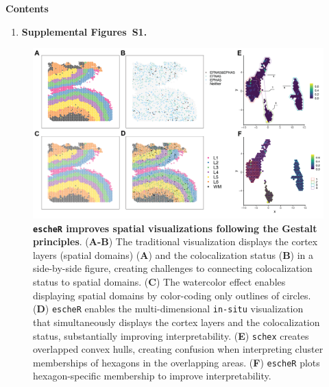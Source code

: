 \documentclass[10pt,twocolumn]{article}
\begin{document}
\renewcommand{\figurename}{Supplementary Figure}
\renewcommand{\tablename}{Supplementary Table}
\setcounter{figure}{0}
\setcounter{table}{0}
\setcounter{section}{0}
\setcounter{page}{1}
\makeatletter
\renewcommand{\thefigure}{S\@arabic\c@figure}
\renewcommand{\thetable}{S\@arabic\c@table}
\renewcommand{\thesection}{Supplemental Note S\@arabic\c@section}
\makeatother

\vspace*{1cm}

{\bf \large Contents}

\begin{enumerate}
    \item \textbf{Supplemental Figures~S1.}
\end{enumerate}

\clearpage 



\begin{figure}[!h]
\begin{center}
\includegraphics[width=\textwidth]{Manuscript/figure/fig_grid.png}
\caption{\small \textbf{\texttt{escheR} improves spatial visualizations following the Gestalt principles}. (\textbf{A-B}) The traditional visualization displays the cortex layers (spatial domains) (\textbf{A}) and the colocalization status (\textbf{B}) in a side-by-side figure, creating challenges to connecting colocalization status to spatial domains. (\textbf{C}) The watercolor effect enables displaying spatial domains by color-coding only outlines of circles. (\textbf{D}) \texttt{escheR} enables the multi-dimensional \texttt{in-situ} visualization that simultaneously displays the cortex layers and the colocalization status, substantially improving interpretability. (\textbf{E}) \texttt{schex} creates overlapped convex hulls, creating confusion when interpreting cluster memberships of hexagons in the overlapping areas. (\textbf{F}) \texttt{escheR} plots hexagon-specific membership to improve interpretability.}
\label{fig:embedding} 
\end{center}
\end{figure}
\end{document}
